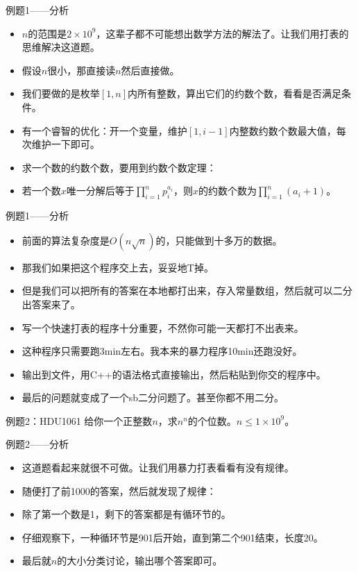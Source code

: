 \documentclass{beamer}[UTF-8]
\begin{document}
\begin{frame}{例题1——分析}
 \pause
\begin{itemize}
\item $n$的范围是$2 \times 10^9$，这辈子都不可能想出数学方法的解法了。让我们用打表的思维解决这道题。 \pause
\item 假设$n$很小，那直接读$n$然后直接做。 \pause
\item 我们要做的是枚举$[1,n]$内所有整数，算出它们的约数个数，看看是否满足条件。 \pause
\item 有一个睿智的优化：开一个变量，维护$[1,i-1]$内整数约数个数最大值，每次维护一下即可。 \pause
\item 求一个数的约数个数，要用到约数个数定理： \pause
\item 若一个数$x$唯一分解后等于$\prod_{i=1}^n p_i^{a_i}$，则$x$的约数个数为$\prod_{i=1}^n (a_i + 1)$。
\end{itemize}
\end{frame}

\begin{frame}{例题1——分析}
 \pause
\begin{itemize}
\item 前面的算法复杂度是$O(n\sqrt{n})$的，只能做到十多万的数据。 \pause
\item 那我们如果把这个程序交上去，妥妥地T掉。 \pause
\item 但是我们可以把所有的答案在本地都打出来，存入常量数组，然后就可以二分出答案来了。 \pause
\item 写一个快速打表的程序十分重要，不然你可能一天都打不出表来。 \pause
\item 这种程序只需要跑3min左右。我本来的暴力程序10min还跑没好。 \pause
\item 输出到文件，用C++的语法格式直接输出，然后粘贴到你交的程序中。 \pause
\item 最后的问题就变成了一个sb二分问题了。甚至你都不用二分。
\end{itemize}
\end{frame}

\begin{frame}{例题2：HDU1061}
给你一个正整数$n$，求$n^n$的个位数。$n \leq 1 \times 10^9$。
\end{frame}

\begin{frame}{例题2——分析}
 \pause
\begin{itemize}
\item 这道题看起来就很不可做。让我们用暴力打表看看有没有规律。 \pause
\item 随便打了前1000的答案，然后就发现了规律： \pause
\item 除了第一个数是1，剩下的答案都是有循环节的。 \pause
\item 仔细观察下，一种循环节是901后开始，直到第二个901结束，长度20。 \pause
\item 最后就$n$的大小分类讨论，输出哪个答案即可。
\end{itemize}
\end{frame}
\end{document}
